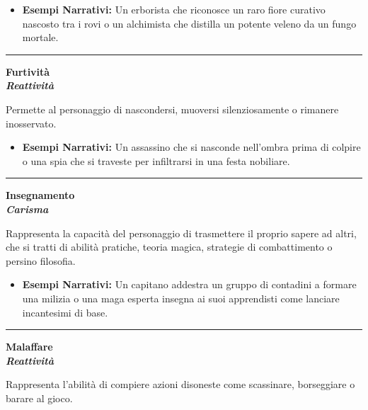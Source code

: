 \documentclass[../manuale_main.tex]{subfiles}
\begin{document}
\begin{itemize}
\item \textbf{Esempi Narrativi:} Un erborista che riconosce un raro fiore curativo nascosto tra i rovi o un alchimista che distilla un potente veleno da un fungo mortale.
\end{itemize}

\vspace{0.5cm}\rule{\textwidth}{0.4pt}\vspace{0.5cm}

\begin{center}
\textbf{\large{Furtività}}\\ \textit{\textbf{Reattività}}\\
\end{center}
Permette al personaggio di nascondersi, muoversi silenziosamente o rimanere inosservato.

\begin{itemize}
\item \textbf{Esempi Narrativi:} Un assassino che si nasconde nell'ombra prima di colpire o una spia che si traveste per infiltrarsi in una festa nobiliare.
\end{itemize}

\vspace{0.5cm}\rule{\textwidth}{0.4pt}\vspace{0.5cm}

\begin{center}
\textbf{\large{Insegnamento}}\\ \textit{\textbf{Carisma}}\\
\end{center}
Rappresenta la capacità del personaggio di trasmettere il proprio sapere ad altri, che si tratti di abilità pratiche, teoria magica, strategie di combattimento o persino filosofia.

\begin{itemize}
\item \textbf{Esempi Narrativi:} Un capitano addestra un gruppo di contadini a formare una milizia o una maga esperta insegna ai suoi apprendisti come lanciare incantesimi di base.
\end{itemize}

\vspace{0.5cm}\rule{\textwidth}{0.4pt}\vspace{0.5cm}

\begin{center}
\textbf{\large{Malaffare}}\\ \textit{\textbf{Reattività}}\\
\end{center}
Rappresenta l’abilità di compiere azioni disoneste come scassinare, borseggiare o barare al gioco.
\end{document}
